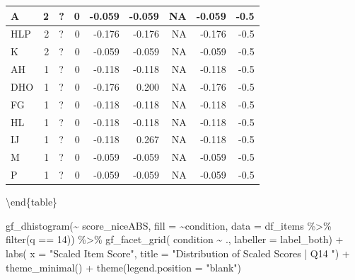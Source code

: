\documentclass[
  letterpaper,
  DIV=11,
  numbers=noendperiod]{scrreprt}
\newenvironment{Shaded}{\begin{snugshade}}{\end{snugshade}}
\newcommand{\AttributeTok}[1]{\textcolor[rgb]{0.40,0.45,0.13}{#1}}
\newcommand{\DecValTok}[1]{\textcolor[rgb]{0.68,0.00,0.00}{#1}}
\newcommand{\FunctionTok}[1]{\textcolor[rgb]{0.28,0.35,0.67}{#1}}
\newcommand{\NormalTok}[1]{\textcolor[rgb]{0.00,0.23,0.31}{#1}}
\newcommand{\SpecialCharTok}[1]{\textcolor[rgb]{0.37,0.37,0.37}{#1}}
\newcommand{\StringTok}[1]{\textcolor[rgb]{0.13,0.47,0.30}{#1}}
\begin{document}
\begin{tabular}[t]{l|r|l|r|r|r|r|r|r}
\hline
\hspace{1em}A & 2 & ? & 0 & -0.059 & -0.059 & NA & -0.059 & -0.5\\
\hline
\hspace{1em}HLP & 2 & ? & 0 & -0.176 & -0.176 & NA & -0.176 & -0.5\\
\hline
\hspace{1em}K & 2 & ? & 0 & -0.059 & -0.059 & NA & -0.059 & -0.5\\
\hline
\hspace{1em}AH & 1 & ? & 0 & -0.118 & -0.118 & NA & -0.118 & -0.5\\
\hline
\hspace{1em}DHO & 1 & ? & 0 & -0.176 & 0.200 & NA & -0.176 & -0.5\\
\hline
\hspace{1em}FG & 1 & ? & 0 & -0.118 & -0.118 & NA & -0.118 & -0.5\\
\hline
\hspace{1em}HL & 1 & ? & 0 & -0.118 & -0.118 & NA & -0.118 & -0.5\\
\hline
\hspace{1em}IJ & 1 & ? & 0 & -0.118 & 0.267 & NA & -0.118 & -0.5\\
\hline
\hspace{1em}M & 1 & ? & 0 & -0.059 & -0.059 & NA & -0.059 & -0.5\\
\hline
\hspace{1em}P & 1 & ? & 0 & -0.059 & -0.059 & NA & -0.059 & -0.5\\
\hline
\end{tabular}

\textbackslash end\{table\}

\begin{Shaded}
\begin{Highlighting}[]
\FunctionTok{gf\_dhistogram}\NormalTok{(}\SpecialCharTok{\textasciitilde{}}\NormalTok{ score\_niceABS, }\AttributeTok{fill =} \SpecialCharTok{\textasciitilde{}}\NormalTok{condition, }\AttributeTok{data =}\NormalTok{ df\_items }\SpecialCharTok{\%\textgreater{}\%} \FunctionTok{filter}\NormalTok{(q }\SpecialCharTok{==} \DecValTok{14}\NormalTok{)) }\SpecialCharTok{\%\textgreater{}\%} 
  \FunctionTok{gf\_facet\_grid}\NormalTok{( condition }\SpecialCharTok{\textasciitilde{}}\NormalTok{ ., }\AttributeTok{labeller =}\NormalTok{ label\_both) }\SpecialCharTok{+} 
  \FunctionTok{labs}\NormalTok{( }\AttributeTok{x =} \StringTok{"Scaled Item Score"}\NormalTok{, }\AttributeTok{title =} \StringTok{"Distribution of Scaled Scores | Q14 "}\NormalTok{) }\SpecialCharTok{+} 
  \FunctionTok{theme\_minimal}\NormalTok{() }\SpecialCharTok{+} \FunctionTok{theme}\NormalTok{(}\AttributeTok{legend.position =} \StringTok{"blank"}\NormalTok{)}
\end{Highlighting}
\end{Shaded}
\end{document}

